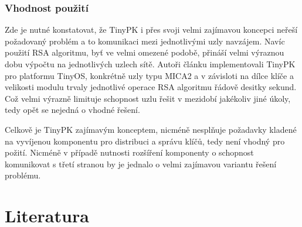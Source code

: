 \documentclass[11pt,final,twoside]{fithesis2}
\begin{document}
\subsection{Vhodnost použití}

Zde je nutné konstatovat, že TinyPK i přes svoji velmi zajímavou koncepci neřeší požadovaný problém a to komunikaci mezi jednotlivými
uzly navzájem. Navíc použití RSA algoritmu, byť ve velmi omezené podobě, přináší velmi výraznou dobu výpočtu na jednotlivých uzlech sítě. 
Autoři článku implementovali TinyPK pro platformu TinyOS, konkrétně uzly typu MICA2\cite{Inc.} a v závisloti na dílce klíče a velikosti modulu
trvaly jednotlivé operace RSA algoritmu řádově desitky sekund. Což velmi výrazně limituje schopnost uzlu řešit v mezidobí jakékoliv jiné úkoly, 
tedy opět se nejedná o vhodné řešení. 

Celkově je TinyPK zajímavým konceptem, nicméně nesplňuje požadavky kladené na vyvíjenou komponentu pro distribuci a správu klíčů, tedy není vhodný 
pro požití. Nicméně v případě nutnosti rozšíření komponenty o schopnost komunikovat s třetí stranou by je jednalo o velmi zajímavou variantu řešení problému.






\begingroup
\def\tmpchapter{0}
\renewcommand{\chaptername}{}
\renewcommand{\thechapter}{}
\chapter{Literatura}
\renewcommand{\chapter}[2]{}%




\endgroup

\appendix

\end{document}
